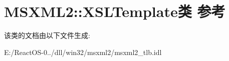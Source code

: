 \hypertarget{class_m_s_x_m_l2_1_1_x_s_l_template}{}\section{M\+S\+X\+M\+L2\+:\+:X\+S\+L\+Template类 参考}
\label{class_m_s_x_m_l2_1_1_x_s_l_template}


该类的文档由以下文件生成\+:\begin{DoxyCompactItemize}
\item 
E\+:/\+React\+O\+S-\/0../dll/win32/msxml2/msxml2\+\_\+tlb.\+idl\end{DoxyCompactItemize}

